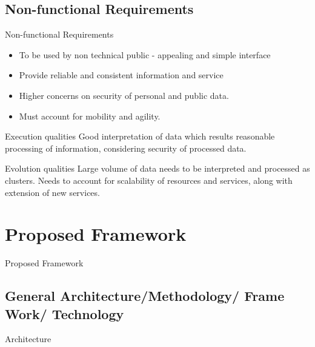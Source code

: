 \documentclass{beamer}
\begin{document}
\subsection{Non-functional Requirements}
\begin{frame}{Non-functional Requirements}
    \begin{itemize}
        \item To be used by non technical public - appealing and simple interface
        \item Provide reliable and consistent information and service
        \item Higher concerns on security of personal and public data.
        \item Must account for mobility and agility.
    \end{itemize}
    
    \begin{block}{Execution qualities}
        Good interpretation of data which results reasonable processing of information, considering security of processed data.
    \end{block}

    \begin{block}{Evolution qualities}
        Large volume of data needs to be interpreted and processed as clusters. Needs to account for scalability of resources and services, along with extension of new services.
    \end{block}
\end{frame}


\section{Proposed Framework}
\begin{frame}{Proposed Framework}
\end{frame}


\subsection{General Architecture/Methodology/ Frame Work/ Technology}
\begin{frame}{Architecture}
\end{frame}
\end{document}
